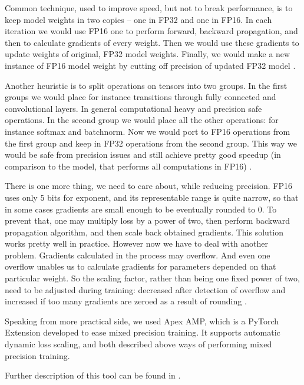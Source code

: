 \documentclass[licencjacka,en]{pracamgr}
\begin{document}
Common technique, used to improve speed, but not to break performance, is to keep model weights in two copies -- one in FP32 and one in FP16. In each iteration we would use FP16 one to perform forward, backward propagation, and then to calculate gradients of every weight. Then we would use these gradients to update weights of original, FP32 model weights. Finally, we would make a new instance of FP16 model weight by cutting off precision of updated FP32 model \cite{APEX}.

Another heuristic is to split operations on tensors into two groups. In the first groups we would place for instance transitions through fully connected and convolutional layers. In general computational heavy and precision safe operations. In the second group we would place all the other operations: for instance softmax and batchnorm. Now we would port to FP16 operations from the first group and keep in FP32 operations from the second group. This way we would be safe from precision issues and still achieve pretty good speedup (in comparison to the model, that performs all computations in FP16) \cite{APEX}.

There is one more thing, we need to care about, while reducing precision. FP16 uses only 5 bits for exponent, and its representable range is quite narrow, so that in some cases gradients are small enough to be eventually rounded to 0. To prevent that, one may multiply loss by a power of two, then perform backward propagation algorithm, and then scale back obtained gradients. This solution works pretty well in practice. However now we have to deal with another problem. Gradients calculated in the process may overflow. And even one overflow unables us to calculate gradients for parameters depended on that particular weight. So the scaling factor, rather than being one fixed power of two, need to be adjusted during training: decreased after detection of overflow and increased if too many gradients are zeroed as a result of rounding \cite{LOSS_SCALING}.

Speaking from more practical side, we used Apex AMP, which is a PyTorch Extension developed to ease mixed precision training. It supports automatic dynamic loss scaling, and both described above ways of performing mixed precision training.

Further description of this tool can be found in \cite{APEX_DOCS}.
\end{document}
